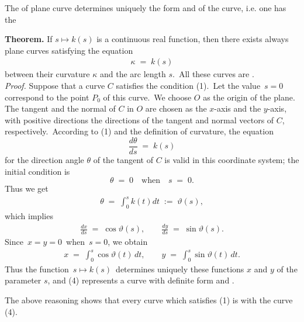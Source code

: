 \documentclass[12pt]{article}
\theoremstyle{definition}
\begin{document}
 

The  of plane curve determines uniquely the form and  of the curve, i.e. one has the

\textbf{Theorem.}\; If\; $s\mapsto k(s)$\; is a continuous real function, then there exists always plane curves satisfying the equation
\begin{align}
        \kappa \;=\; k(s)
\end{align}
between their curvature $\kappa$ and the arc length $s$.\, All these curves are .\\

{\em Proof.}\; Suppose that a curve $C$ satisfies the condition (1).\, Let the value\, $s = 0$\, correspond to the point $P_0$ of this curve.\, We choose $O$ as the origin of the plane.\, The tangent and the normal of $C$ in $O$ are chosen as the $x$-axis and the $y$-axis, with positive directions the directions of the tangent and normal vectors of $C$, respectively.\, According to (1) and the definition of curvature, the equation
          $$\frac{d\theta}{ds} \;=\; k(s)$$
for the direction angle $\theta$ of the tangent of $C$ is valid in this coordinate system; the initial condition is
$$\theta \;=\; 0 \quad \mbox{when} \quad s \;=\; 0.$$
Thus we get
\begin{align}
     \theta \;=\; \int_0^s k(t) d\!t \;:=\; \vartheta(s),
\end{align}
which implies
\begin{align}
   \frac{dx}{ds} \;=\; \cos{\vartheta(s)}, \qquad 
   \frac{dy}{ds} \;=\; \sin{\vartheta(s)}.
\end{align}
Since\, $x = y = 0$\, when\, $s = 0$, we obtain
\begin{align}
  x \;=\; \int_0^s \cos{\vartheta(t)}\,dt, \qquad y \;=\; 
  \int_0^s \sin{\vartheta(t)}\,dt.
\end{align}
Thus the function \,$s\mapsto k(s)$\, determines uniquely these functions $x$ and $y$ of the parameter $s$, and (4) represents a curve with definite form and .

The above reasoning shows that every curve which satisfies (1) is  with the curve (4).
\end{document}
